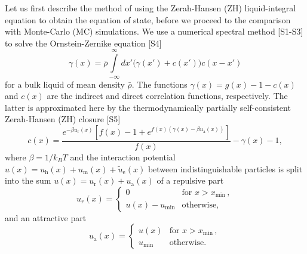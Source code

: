 \documentclass[aps,pre,twocolumn,superscriptaddress,nofootinbib]{revtex4}
\begin{document}
\setcounter{equation}{0}
\setcounter{figure}{0}
\setcounter{table}{0}
\setcounter{page}{1}
\makeatletter
\renewcommand{\theequation}{S\arabic{equation}}
\renewcommand{\thefigure}{S\arabic{figure}}
\renewcommand{\bibnumfmt}[1]{[S#1]}
\renewcommand{\citenumfont}[1]{S#1}


Let us first describe the method of using the Zerah-Hansen (ZH) liquid-integral equation to obtain the equation of state, before we proceed to the comparison with Monte-Carlo (MC) simulations.
We use a numerical spectral method [S1-S3] to solve the Ornstein-Zernike equation [S4]
%
\begin{equation}\label{eq:O-Z}
\gamma(x) = \bar{\rho} \int\limits_{-\infty}^{\infty} dx' \big( \gamma(x') + c(x') \big) c(x-x')  
\end{equation}
%
for a bulk liquid of mean density $\bar{\rho}$. 
The functions $\gamma(x) = g(x) - 1 - c(x)$ and $c(x)$ are the indirect and direct correlation functions, respectively.
The latter is approximated here by the thermodynamically partially self-consistent Zerah-Hansen (ZH) closure [S5]
%
\begin{equation}\label{eq:ZH}
c(x) = \dfrac{e^{-\beta u_\textrm{r}(x)} \left[ f(x) - 1 + e^{f(x)\left(\gamma(x) -\beta u_\textrm{a}(x)\right)} \right]}{f(x)} -
       \gamma(x) - 1, 
\end{equation}
% 
where $\beta = 1 / k_BT$ and the interaction potential $u(x) = u_\textrm{h}(x) + u_\textrm{m}(x) + \tilde{u}_\textrm{e}(x)$ %
between indistinguishable particles is split into the sum $u(x) = u_\textrm{r}(x) + u_\textrm{a}(x)$ of a repulsive part
%
\begin{equation}\label{eq:u_repulsive}
u_{r}(x) = \begin{cases}
	0	&	\textrm{for} \,\, x > x_\textrm{min}\, ,\\
	u(x) - u_\textrm{min}	&	\textrm{otherwise,}
\end{cases}
\end{equation}
% 
and an attractive part
%
\begin{equation}\label{eq:u_attractive}
u_\textrm{a}(x) = \begin{cases}
	u(x)	&	\textrm{for} \,\, x > x_\textrm{min}\, ,\\
	u_\textrm{min}	&	\textrm{otherwise.}
\end{cases}
\end{equation}
\end{document}
